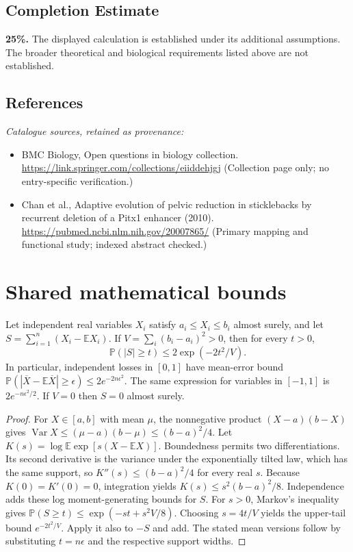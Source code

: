 \documentclass[11pt]{article}
\begin{document}
\subsection{Completion Estimate}
\textbf{25\%.} The displayed calculation is established under its additional assumptions. The broader theoretical and biological requirements listed above are not established.
\subsection{References}
\noindent\emph{Catalogue sources, retained as provenance:}
\begin{itemize}
\item BMC Biology, Open questions in biology collection. \url{https://link.springer.com/collections/eiiddehjgj} (Collection page only; no entry-specific verification.)
\item Chan et al., Adaptive evolution of pelvic reduction in sticklebacks by recurrent deletion of a Pitx1 enhancer (2010). \url{https://pubmed.ncbi.nlm.nih.gov/20007865/} (Primary mapping and functional study; indexed abstract checked.)
\end{itemize}




\section{Shared mathematical bounds}\label{app:bounds}
\begin{lemma}\label{lem:bounded}
Let independent real variables $X_i$ satisfy $a_i\leq X_i\leq b_i$ almost surely,
and let $S=\sum_{i=1}^n(X_i-\mathbb{E} X_i)$. If
$V=\sum_i(b_i-a_i)^2>0$, then for every $t>0$,
\[
 \mathbb{P}(|S|\geq t)\leq 2\exp(-2t^2/V).
\]
In particular, independent losses in $[0,1]$ have mean-error bound
$\mathbb{P}(|\overline X-\mathbb{E}\overline X|\geq\epsilon)
\leq2e^{-2n\epsilon^2}$. The same expression for variables in $[-1,1]$
is $2e^{-n\epsilon^2/2}$. If $V=0$ then $S=0$ almost surely.
\end{lemma}
\begin{proof}
For $X\in[a,b]$ with mean $\mu$, the nonnegative product
$(X-a)(b-X)$ gives
$\operatorname{Var} X\leq(\mu-a)(b-\mu)\leq(b-a)^2/4$.
Let $K(s)=\log\mathbb{E}\exp[s(X-\mathbb{E} X)]$.
Boundedness permits two differentiations. Its second derivative is the variance
under the exponentially tilted law, which has the same support, so
$K''(s)\leq(b-a)^2/4$ for every real $s$.
Because $K(0)=K'(0)=0$, integration yields
$K(s)\leq s^2(b-a)^2/8$.
Independence adds these log moment-generating bounds for $S$.
For $s>0$, Markov's inequality gives
$\mathbb{P}(S\geq t)\leq\exp(-st+s^2V/8)$.
Choosing $s=4t/V$ yields the upper-tail bound $e^{-2t^2/V}$.
Apply it also to $-S$ and add. The stated mean versions follow by substituting
$t=n\epsilon$ and the respective support widths.
\end{proof}
\end{document}
